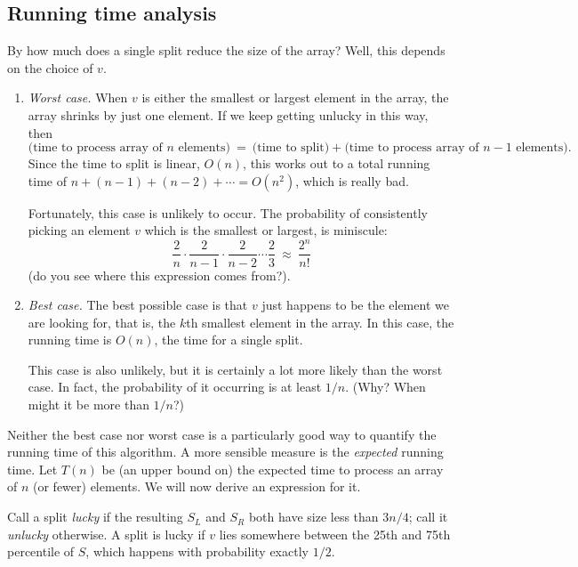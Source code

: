 \subsection{Running time analysis}

By how much does a single split reduce the size of the array? Well, this depends
on the choice of $v$.

\begin{enumerate}
\item {\it Worst case.} When $v$ is either the smallest or largest element in the
array, the array shrinks by just one element. If we keep getting unlucky in
this way, then
$$
\mbox{(time to process array of $n$ elements)}
\ = \ 
\mbox{(time to split)} + \mbox{(time to process array of $n-1$ elements)}.
$$
Since the time to split is linear, $O(n)$, this works out to a total running
time of $n + (n-1) + (n-2) + \cdots = O(n^2)$, which is really bad.

Fortunately, this case is unlikely to occur. The probability of consistently
picking an element $v$ which is the smallest or largest, is miniscule:
$$ \frac{2}{n} \cdot \frac{2}{n-1} \cdot \frac{2}{n-2} \cdots \frac{2}{3}
\ \approx \ 
\frac{2^n}{n!}
$$
(do you see where this expression comes from?).

\item {\it Best case.} The best possible case is that $v$ just happens to be 
the element we are looking for, that is, the $k$th smallest element in the array. 
In this case, the running time is $O(n)$, the time for a single split.

This case is also unlikely, but it is certainly a lot more likely than the worst
case. In fact, the probability of it occurring is at least $1/n$. (Why? When
might it be more than $1/n$?)

\end{enumerate}

Neither the best case nor worst case is a particularly good way to quantify the 
running time of this algorithm. A more sensible measure is the {\it expected} 
running time. Let $T(n)$ be (an upper bound on) the expected time to 
process an array of $n$ (or fewer) elements. We will now derive an expression
for it.

Call a split {\it lucky} if the resulting $S_L$ and $S_R$ both have size less 
than $3n/4$; call it {\it unlucky} otherwise. A split is lucky if $v$ lies 
somewhere between the 25th and 75th percentile of $S$, which happens with
probability exactly $1/2$.

